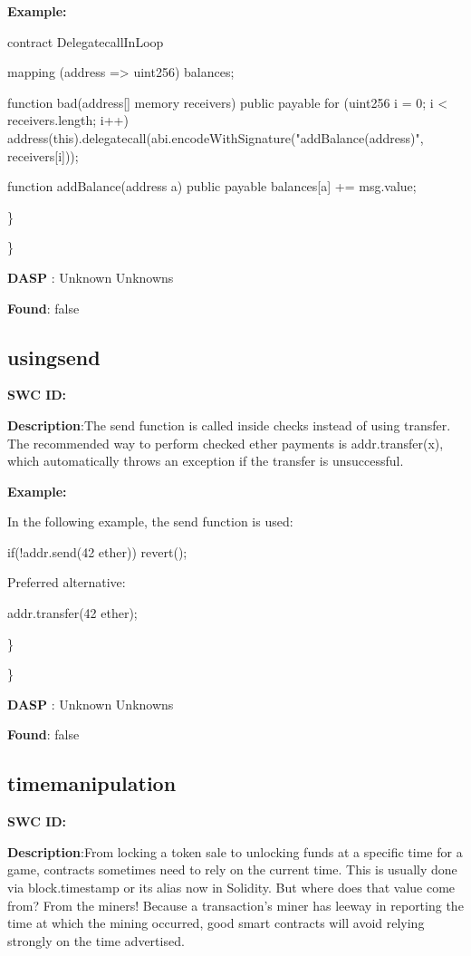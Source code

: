 \documentclass{article}
\begin{document}
{{\textbf{Example:} 

contract DelegatecallInLoop{

    mapping (address => uint256) balances;

    function bad(address[] memory receivers) public payable {
        for (uint256 i = 0; i < receivers.length; i++) {
            address(this).delegatecall(abi.encodeWithSignature("addBalance(address)", receivers[i]));
        }
    }

    function addBalance(address a) public payable {
        balances[a] += msg.value;
    }
}

\} 

\} 

\textbf{DASP} : Unknown Unknowns

\textbf{Found}: false

\subsection{using\textunderscore send} 
\textbf{SWC \textunderscore ID:} 

\textbf{Description}:The send function is called inside checks instead of using transfer. The recommended way to perform checked ether payments is addr.transfer(x), which automatically throws an exception if the transfer is unsuccessful.


\textbf{Example:} 

In the following example, the send function is used:


if(!addr.send(42 ether)) {
    revert();
}

Preferred alternative:

addr.transfer(42 ether);

\} 

\} 

\textbf{DASP} : Unknown Unknowns

\textbf{Found}: false

\subsection{time\textunderscore manipulation} 
\textbf{SWC \textunderscore ID:} 

\textbf{Description}:From locking a token sale to unlocking funds at a specific time for a game, contracts sometimes need to rely on the current time. This is usually done via block.timestamp or its alias now in Solidity. But where does that value come from? From the miners! Because a transaction's miner has leeway in reporting the time at which the mining occurred, good smart contracts will avoid relying strongly on the time advertised.


}}
\end{document}
